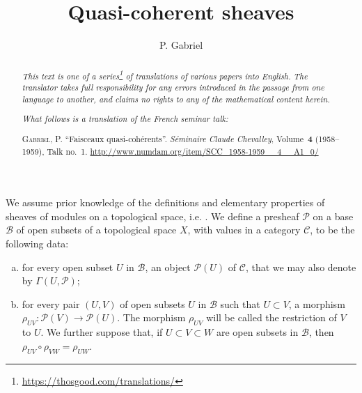 \documentclass{article}
\title{Quasi-coherent sheaves}
\author{P. Gabriel}
\date{}
\theoremstyle{plain}
\theoremstyle{definition}
\newcommand{\sh}[1]{{\mathscr{#1}}}
\newcommand{\cat}[1]{{\mathcal{#1}}}
\newcommand{\oldpage}[1]{\marginpar{\footnotesize$\Big\vert$ \textit{p.~#1}}}
\begin{document}
\maketitle
\thispagestyle{fancy}

\renewcommand{\abstractname}{Translator's note.}

\begin{abstract}
  \renewcommand*{\thefootnote}{\fnsymbol{footnote}}
  \emph{This text is one of a series\footnote{\url{https://thosgood.com/translations/}} of translations of various papers into English.}
  \emph{The translator takes full responsibility for any errors introduced in the passage from one language to another, and claims no rights to any of the mathematical content herein.}

  \medskip
  
  \emph{What follows is a translation of the French seminar talk:}

  \medskip\noindent
  \textsc{Gabriel, P.}
  ``Faisceaux quasi-coh\'{e}rents''.
  \emph{S\'{e}minaire Claude Chevalley}, Volume~\textbf{4} (1958--1959), Talk no.~1.
  {\url{http://www.numdam.org/item/SCC_1958-1959__4__A1_0/}}
\end{abstract}

\setcounter{footnote}{0}

\tableofcontents
\bigskip



\oldpage{1-01}
We assume prior knowledge of the definitions and elementary properties of sheaves of modules on a topological space, i.e. \cite[chapitre~I, \S1; chapitre~II, \S\S1--2]{2}.
We define a presheaf $\sh{P}$ on a base $\mathscr{B}$ of open subsets of a topological space $X$, with values in a category $\cat{C}$, to be the following data:
\begin{enumerate}[(a)]
  \item for every open subset $U$ in $\mathscr{B}$, an object $\sh{P}(U)$ of $\cat{C}$, that we may also denote by $\Gamma(U,\sh{P})$;
  \item for every pair $(U,V)$ of open subsets $U$ in $\mathscr{B}$ such that $U\subset V$, a morphism $\rho_{UV}\colon\sh{P}(V)\to\sh{P}(U)$.
    The morphism $\rho_{UV}$ will be called the restriction of $V$ to $U$.
    We further suppose that, if $U\subset V\subset W$ are open subsets in $\mathscr{B}$, then $\rho_{UV}\circ\rho_{VW}=\rho_{UW}$.
\end{enumerate}
\end{document}
